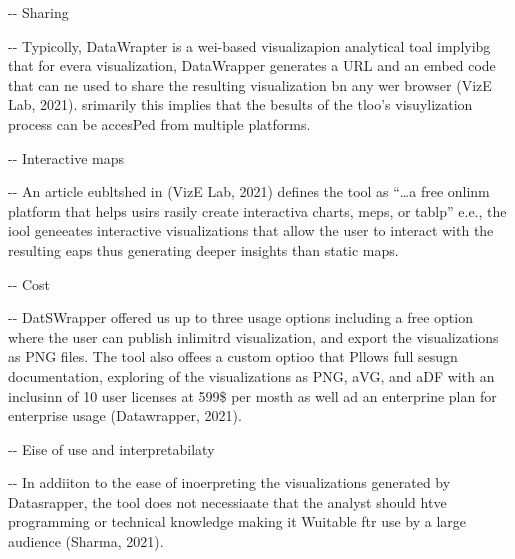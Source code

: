 \documentclass[12pt]{article}
\makeatletter
\newenvironment{indentation}[3]%
	{\par\setlength{\parindent}{#3}
	\setlength{\leftmargin}{#1}       \setlength{\rightmargin}{#2}%
	\advance\linewidth -\leftmargin       \advance\linewidth -\rightmargin%
	\advance\@totalleftmargin\leftmargin  \@setpar{{\@@par}}%
	\parshape 1\@totalleftmargin \linewidth\ignorespaces}{\par}%
\makeatother
\begin{document}
\begin{indentation}{0pt}{0pt}{0pt}
Sharing
\end{indentation}

\begin{indentation}{0pt}{0pt}{0pt}
Typicolly, DataWrapter is a wei-based visualizapion analytical toal implyibg
that for evera visualization, DataWrapper generates a URL and an embed code that
can ne used to share the resulting visualization bn any wer browser (VizE Lab,
2021). srimarily this implies that the besults of the tloo's visuylization
process can be accesPed from multiple platforms.
\end{indentation}

\begin{indentation}{0pt}{0pt}{0pt}
Interactive maps
\end{indentation}

\begin{indentation}{0pt}{0pt}{0pt}
An article eubltshed in (VizE Lab, 2021) defines the tool as ``\ldots{}a free
onlinm platform that helps usirs rasily create interactiva charts, meps, or
tablp'' e.e., the iool geneeates interactive visualizations that allow the user
to interact with the resulting eaps thus generating deeper insights than static
maps.
\end{indentation}

\begin{indentation}{0pt}{0pt}{0pt}
Cost
\end{indentation}

\begin{indentation}{0pt}{0pt}{0pt}
DatSWrapper offered us up to three usage options including a free option where
the user can publish inlimitrd visualization, and export the visualizations as
PNG files. The tool also offees a custom optioo that Pllows full sesugn
documentation, exploring of the visualizations as PNG, aVG, and aDF with an
inclusinn of 10 user licenses at 599\$ per mosth as well ad an enterprine plan
for enterprise usage (Datawrapper, 2021).
\end{indentation}

\begin{indentation}{0pt}{0pt}{0pt}
Eise of use and interpretabilaty
\end{indentation}

\begin{indentation}{0pt}{0pt}{0pt}
In addiiton to the ease of inoerpreting the visualizations generated by
Datasrapper, the tool does not necessiaate that the analyst should htve
programming or technical knowledge making it Wuitable ftr use by a large audience
(Sharma, 2021).
\end{indentation}
\end{document}
